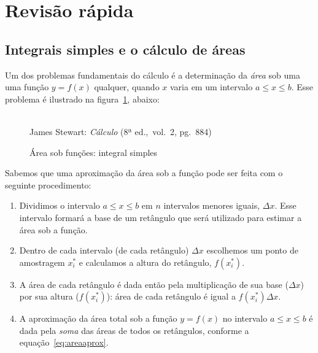 \section{Revisão rápida}
\label{sec:revisao}

\subsection{Integrais simples e o cálculo de áreas}
\label{sec:revisao-int1}
Um dos problemas fundamentais do cálculo é a determinação da \emph{área} sob
uma uma função $y = f(x)$ qualquer, quando $x$ varia em um intervalo
$a \le x \le b$. Esse problema é ilustrado na figura~\ref{fig:area}, abaixo:

\begin{figure}[H]
  \begin{center}
    \caption{Área sob funções: integral simples}
    \label{fig:area}
    \\
    \footnotesize{James Stewart: \emph{Cálculo} (8ª ed.,\ vol.\ 2,
      pg.\ 884)}
  \end{center}
\end{figure}

Sabemos que uma aproximação da área sob a função pode ser feita
com o seguinte procedimento:

\begin{enumerate}
  \item Dividimos o intervalo $a \le x \le b$ em $n$ intervalos
    menores iguais, $\Delta x$. Esse intervalo formará a base
    de um retângulo que será utilizado para estimar a área sob a
    função.
  \item Dentro de cada intervalo (de cada retângulo) $\Delta x$
    escolhemos um ponto de amostragem $x^*_i$ e calculamos a altura
    do retângulo, $f(x^*_i)$.
  \item A área de cada retângulo é dada então pela multiplicação de
    sua base ($\Delta x$) por sua altura ($f(x^*_i)$): área de cada
    retângulo é igual a $f(x^*_i) \Delta x$.
  \item A aproximação da área total sob a função $y = f(x)$ no
    intervalo $a \le x \le b$ é dada pela \emph{soma} das áreas de
    todos os retângulos, conforme a equação~\ref{eq:areaaprox}.
\end{enumerate}

